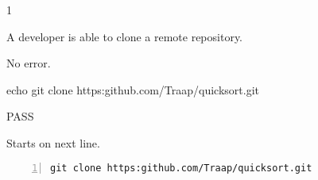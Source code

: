 \begin{description}[align=right,leftmargin=3.2cm,labelindent=3.0cm]
\item[Step:] 1
\item[Confirm:] A developer is able to clone a remote repository.
\item[Expectation:] No error.
\item[Command:] echo git  clone https:github.com/Traap/quicksort.git
\item[Test Result:] PASS
\item[Evidence:] Starts on next line.
\end{description}
\begin{lstlisting}[numbers=left]
git clone https:github.com/Traap/quicksort.git

\end{lstlisting}
